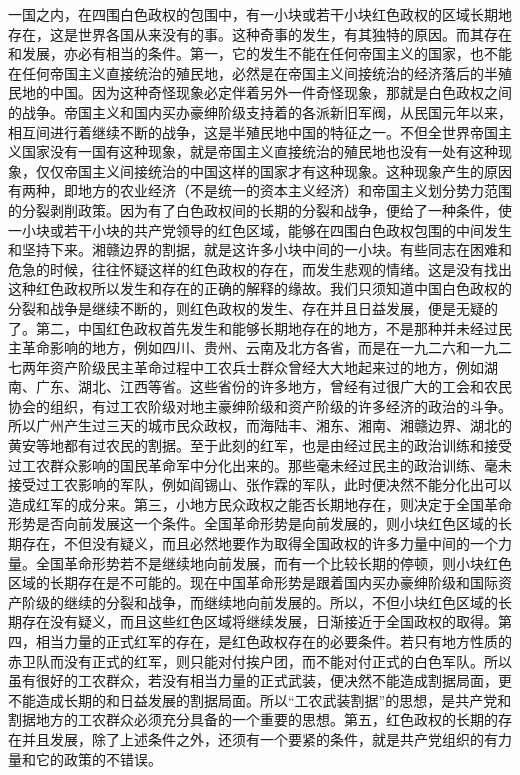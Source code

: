 一国之内，在四围白色政权的包围中，有一小块或若干小块红色政权的区域长期地存在，这是世界各国从来没有的事。这种奇事的发生，有其独特的原因。而其存在和发展，亦必有相当的条件。第一，它的发生不能在任何帝国主义的国家，也不能在任何帝国主义直接统治的殖民地，必然是在帝国主义间接统治的经济落后的半殖民地的中国。因为这种奇怪现象必定伴着另外一件奇怪现象，那就是白色政权之间的战争。帝国主义和国内买办豪绅阶级支持着的各派新旧军阀，从民国元年以来，相互间进行着继续不断的战争，这是半殖民地中国的特征之一。不但全世界帝国主义国家没有一国有这种现象，就是帝国主义直接统治的殖民地也没有一处有这种现象，仅仅帝国主义间接统治的中国这样的国家才有这种现象。这种现象产生的原因有两种，即地方的农业经济（不是统一的资本主义经济）和帝国主义划分势力范围的分裂剥削政策。因为有了白色政权间的长期的分裂和战争，便给了一种条件，使一小块或若干小块的共产党领导的红色区域，能够在四围白色政权包围的中间发生和坚持下来。湘赣边界的割据，就是这许多小块中间的一小块。有些同志在困难和危急的时候，往往怀疑这样的红色政权的存在，而发生悲观的情绪。这是没有找出这种红色政权所以发生和存在的正确的解释的缘故。我们只须知道中国白色政权的分裂和战争是继续不断的，则红色政权的发生、存在并且日益发展，便是无疑的了。第二，中国红色政权首先发生和能够长期地存在的地方，不是那种并未经过民主革命影响的地方，例如四川、贵州、云南及北方各省，而是在一九二六和一九二七两年资产阶级民主革命过程中工农兵士群众曾经大大地起来过的地方，例如湖南、广东、湖北、江西等省。这些省份的许多地方，曾经有过很广大的工会和农民协会的组织，有过工农阶级对地主豪绅阶级和资产阶级的许多经济的政治的斗争。所以广州产生过三天的城市民众政权，而海陆丰、湘东、湘南、湘赣边界、湖北的黄安等地都有过农民的割据。至于此刻的红军，也是由经过民主的政治训练和接受过工农群众影响的国民革命军中分化出来的。那些毫未经过民主的政治训练、毫未接受过工农影响的军队，例如阎锡山、张作霖的军队，此时便决然不能分化出可以造成红军的成分来。第三，小地方民众政权之能否长期地存在，则决定于全国革命形势是否向前发展这一个条件。全国革命形势是向前发展的，则小块红色区域的长期存在，不但没有疑义，而且必然地要作为取得全国政权的许多力量中间的一个力量。全国革命形势若不是继续地向前发展，而有一个比较长期的停顿，则小块红色区域的长期存在是不可能的。现在中国革命形势是跟着国内买办豪绅阶级和国际资产阶级的继续的分裂和战争，而继续地向前发展的。所以，不但小块红色区域的长期存在没有疑义，而且这些红色区域将继续发展，日渐接近于全国政权的取得。第四，相当力量的正式红军的存在，是红色政权存在的必要条件。若只有地方性质的赤卫队而没有正式的红军，则只能对付挨户团，而不能对付正式的白色军队。所以虽有很好的工农群众，若没有相当力量的正式武装，便决然不能造成割据局面，更不能造成长期的和日益发展的割据局面。所以“工农武装割据”的思想，是共产党和割据地方的工农群众必须充分具备的一个重要的思想。第五，红色政权的长期的存在并且发展，除了上述条件之外，还须有一个要紧的条件，就是共产党组织的有力量和它的政策的不错误。

